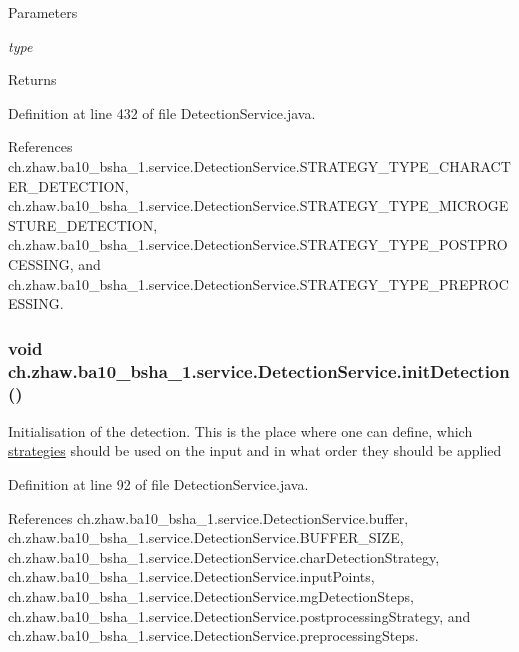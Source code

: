 \begin{DoxyParams}{Parameters}
\item[{\em type}]\end{DoxyParams}
\begin{DoxyReturn}{Returns}

\end{DoxyReturn}


Definition at line 432 of file DetectionService.java.

References ch.zhaw.ba10\_\-bsha\_\-1.service.DetectionService.STRATEGY\_\-TYPE\_\-CHARACTER\_\-DETECTION, ch.zhaw.ba10\_\-bsha\_\-1.service.DetectionService.STRATEGY\_\-TYPE\_\-MICROGESTURE\_\-DETECTION, ch.zhaw.ba10\_\-bsha\_\-1.service.DetectionService.STRATEGY\_\-TYPE\_\-POSTPROCESSING, and ch.zhaw.ba10\_\-bsha\_\-1.service.DetectionService.STRATEGY\_\-TYPE\_\-PREPROCESSING.\hypertarget{classch_1_1zhaw_1_1ba10__bsha__1_1_1service_1_1DetectionService_a0b70bd7c8703ca40307ec7cfb79c4c87}{
\subsubsection[{initDetection}]{\setlength{\rightskip}{0pt plus 5cm}void ch.zhaw.ba10\_\-bsha\_\-1.service.DetectionService.initDetection ()}}
\label{classch_1_1zhaw_1_1ba10__bsha__1_1_1service_1_1DetectionService_a0b70bd7c8703ca40307ec7cfb79c4c87}
Initialisation of the detection. This is the place where one can define, which \hyperlink{namespacech_1_1zhaw_1_1ba10__bsha__1_1_1strategies}{strategies} should be used on the input and in what order they should be applied 

Definition at line 92 of file DetectionService.java.

References ch.zhaw.ba10\_\-bsha\_\-1.service.DetectionService.buffer, ch.zhaw.ba10\_\-bsha\_\-1.service.DetectionService.BUFFER\_\-SIZE, ch.zhaw.ba10\_\-bsha\_\-1.service.DetectionService.charDetectionStrategy, ch.zhaw.ba10\_\-bsha\_\-1.service.DetectionService.inputPoints, ch.zhaw.ba10\_\-bsha\_\-1.service.DetectionService.mgDetectionSteps, ch.zhaw.ba10\_\-bsha\_\-1.service.DetectionService.postprocessingStrategy, and ch.zhaw.ba10\_\-bsha\_\-1.service.DetectionService.preprocessingSteps.

